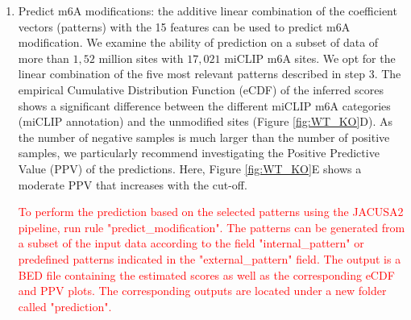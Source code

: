 \documentclass[times, 11pt, a4paper]{article}
\begin{document}
\begin{enumerate}
	
	\begin{spverbatim} 
	$ srun snakemake --cores all get_pattern 	
	\end{spverbatim} 
	\textcolor{red}{The produced patterns and their combinations can be visualized using "visualize\_pattern" rule. The corresponding outputs are under "pattern/viz" folder.}
	\begin{spverbatim} 
$ srun snakemake --cores all visualize_pattern 	
\end{spverbatim} 
	
\item Predict m6A modifications: the additive linear combination of the coefficient vectors (patterns) with the 15 features can be used to predict m6A modification. We examine the ability of prediction on a subset of data of more than $1,52$ million sites with $17,021$ miCLIP m6A sites. We opt for the linear combination of the five most relevant patterns described in step 3. The empirical Cumulative Distribution Function (eCDF) of the inferred scores shows a significant difference between the different miCLIP m6A categories (miCLIP annotation) and the unmodified sites (Figure \ref{fig:WT_KO}D). As the number of negative samples is much larger than the number of positive samples, we particularly recommend investigating the Positive Predictive Value (PPV) of the predictions. Here, Figure \ref{fig:WT_KO}E shows a moderate PPV that increases with the cut-off.  

\textcolor{red}{To perform the prediction based on the selected patterns using the JACUSA2 pipeline, run rule "predict\_modification". The patterns can be generated from a subset of the input data according to the field "internal\_pattern" or predefined patterns indicated in the "external\_pattern" field. The output is a BED file containing the estimated scores as well as the corresponding eCDF and PPV plots. The corresponding outputs are located under a new folder called "prediction". }

 
	
\end{enumerate}
\end{document}
